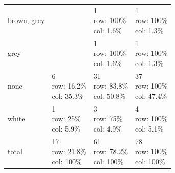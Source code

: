\begin{table}[ht]
{\begin{tabular}{llll}
  brown, grey &  & \makecell{1\\ row: 100\%\\ col: 1.6\%} & \makecell{1\\ row: 100\%\\ col: 1.3\%} \\ 
  grey &  & \makecell{1\\ row: 100\%\\ col: 1.6\%} & \makecell{1\\ row: 100\%\\ col: 1.3\%} \\ 
  none & \makecell{6\\ row: 16.2\%\\ col: 35.3\%} & \makecell{31\\ row: 83.8\%\\ col: 50.8\%} & \makecell{37\\ row: 100\%\\ col: 47.4\%} \\ 
  white & \makecell{1\\ row: 25\%\\ col: 5.9\%} & \makecell{3\\ row: 75\%\\ col: 4.9\%} & \makecell{4\\ row: 100\%\\ col: 5.1\%} \\ 
\midrule
  total & \makecell{17\\ row: 21.8\%\\ col: 100\%} & \makecell{61\\ row: 78.2\%\\ col: 100\%} & \makecell{78\\ row: 100\%\\ col: 100\%} \\ 
   \bottomrule
\end{tabular}
}
\end{table}
